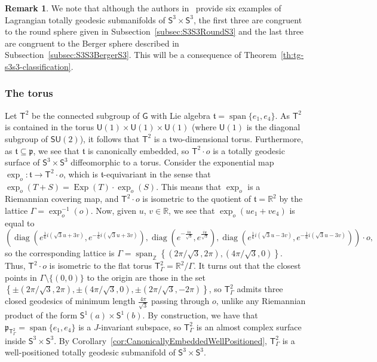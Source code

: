 \documentclass[11pt,a4paper,final]{amsart}
\newcommand{\s}{\mathsf}
\newcommand{\g}{\mathfrak}
\newcommand{\R}{\mathbb{R}}
\newcommand{\vecspan}{\operatorname{span}}
\newcommand{\Exp}{\operatorname{Exp}}
\theoremstyle{definition}
\newtheorem{remark}[theorem]{Remark}
\begin{document}
\begin{remark}
	We note that although the authors in~\cite{ZhangDioosHuVranckenWang} provide six examples of Lagrangian totally geodesic submanifolds of $\s{S}^{3}\times \s{S}^{3}$, the first three are congruent to the round sphere given in Subsection~\ref{subsec:S3S3RoundS3} and the last three are congruent to the Berger sphere described in Subsection~\ref{subsec:S3S3BergerS3}.
	This will be a consequence of Theorem~\ref{th:tg-s3s3-classification}. 
\end{remark}

\subsubsection{The torus \cite[Example 1]{BoltonDillenDioosVrancken}}
	
Let $\mathsf{T}^2$ be the connected subgroup of $\mathsf{G}$ with Lie algebra $\g{t}=\vecspan\{e_{1},e_{4}\}$.
As $\mathsf{T}^2$ is contained in the torus $\mathsf{U}(1)\times\mathsf{U}(1)\times\mathsf{U}(1)$ (where $\mathsf{U}(1)$ is the diagonal subgroup of $\mathsf{SU}(2)$), it follows that
$\mathsf{T}^2$ is a two-dimensional torus.
Furthermore, as $\g{t}\subseteq \g{p}$, we see that $\g{t}$ is canonically embedded, so $\mathsf{T}^2\cdot o$ is a totally geodesic surface of $\mathsf{S}^{3}\times\mathsf{S}^{3}$ diffeomorphic to a torus. 
Consider the exponential map $\exp_{o}\colon\g{t}\to\mathsf{T}^2\cdot o$, which is $\g{t}$-equivariant in the sense that $\exp_{o}(T+S)=\Exp(T)\cdot \exp_{o}(S)$.
This means that $\exp_{o}$ is a Riemannian covering map, and $\mathsf{T}^2\cdot o$ is isometric to the quotient of $\g{t}=\R^{2}$ by the lattice $\Gamma=\exp_{o}^{-1}(o)$.
Now, given $u$, $v\in \R$, we see that $\exp_{o}(u e_{1}+ve_{4})$ is equal to
\[
	\left(\operatorname{diag}\left(e^{\frac{1}{6} i \left(\sqrt{3} u+3 v\right)},e^{-\frac{1}{6} i \left(\sqrt{3} u+3 v\right)}\right),\operatorname{diag}\left(e^{-\frac{i u}{\sqrt{3}}},e^{\frac{i u}{\sqrt{3}}}\right),\operatorname{diag}\left( e^{\frac{1}{6} i \left(\sqrt{3} u-3 v\right)},e^{-\frac{1}{6} i \left(\sqrt{3} u-3 v\right)}\right)\right)\cdot o,
\]
so the corresponding lattice is $\Gamma=\vecspan_{\mathbb{Z}} \left\{ (2\pi/\sqrt{3},2\pi),(4\pi/\sqrt{3},0) \right\}$.
Thus, $\mathsf{T}^2\cdot o$ is isometric to the flat torus $\mathsf{T}^2_{\Gamma}=\R ^{2}/\Gamma$.
It turns out that the closest points in $\Gamma \setminus \{(0,0)\}$ to the origin are those in the set $\left\{
	\pm \left(2 \pi/\sqrt{3} ,2 \pi \right), \pm\left(4\pi/\sqrt{3},0\right), \pm\left(2\pi/\sqrt{3} ,-2 \pi \right)
\right\}$, so $\mathsf{T}^2_{\Gamma}$ admits three closed geodesics of minimum length $\frac{4 \pi}{\sqrt{3}}$ passing through $o$, unlike any Riemannian product of the form $\mathsf{S}^{1}(a)\times\mathsf{S}^{1}(b)$.
By construction, we have that $\g{p}_{\mathsf{T}^2_{\Gamma}}=\vecspan \{e_{1},e_{4}\}$
is a $J$-invariant subspace, so $\mathsf{T}^2_{\Gamma}$ is an almost complex surface inside $\mathsf{S}^{3}\times\mathsf{S}^{3}$.
By Corollary~\ref{cor:CanonicallyEmbeddedWellPositioned}, $\s{T}^2_{\Gamma}$ is a well-positioned totally geodesic submanifold of $\s{S}^{3}\times\s{S}^{3}$.
	
\end{document}
